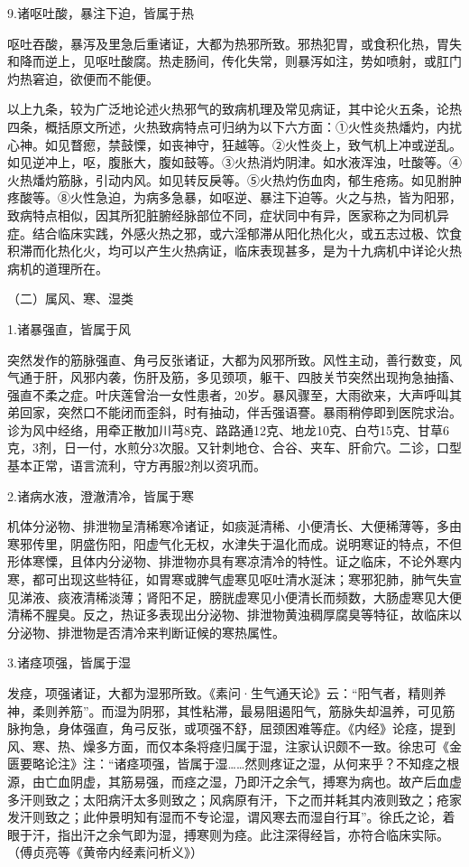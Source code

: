 \documentclass[draft,12pt]{ctexbook}
\begin{document}
9.诸呕吐酸，暴注下迫，皆属于热

呕吐吞酸，暴泻及里急后重诸证，大都为热邪所致。邪热犯胃，或食积化热，胃失和降而逆上，见呕吐酸腐。热走肠间，传化失常，则暴泻如注，势如喷射，或肛门灼热窘迫，欲便而不能便。

以上九条，较为广泛地论述火热邪气的致病机理及常见病证，其中论火五条，论热四条，概括原文所述，火热致病特点可归纳为以下六方面：①火性炎热燔灼，内扰心神。如见瞀瘛，禁鼓慄，如丧神守，狂越等。②火性炎上，致气机上冲或逆乱。如见逆冲上，呕，腹胀大，腹如鼓等。③火热消灼阴津。如水液浑浊，吐酸等。④火热燔灼筋脉，引动内风。如见转反戾等。⑤火热灼伤血肉，郁生疮疡。如见胕肿疼酸等。⑧火性急迫，为病多急暴，如呕逆、暴注下迫等。火之与热，皆为阳邪，致病特点相似，因其所犯脏腑经脉部位不同，症状同中有异，医家称之为同机异症。结合临床实践，外感火热之邪，或六淫郁滞从阳化热化火，或五志过极、饮食积滞而化热化火，均可以产生火热病证，临床表现甚多，是为十九病机中详论火热病机的道理所在。

（二）属风、寒、湿类

1.诸暴强直，皆属于风

突然发作的筋脉强直、角弓反张诸证，大都为风邪所致。风性主动，善行数变，风气通于肝，风邪内袭，伤肝及筋，多见颈项，躯干、四肢关节突然出现拘急抽搐、强直不柔之症。叶庆莲曾治一女性患者，20岁。暴风骤至，大雨欲来，大声呼叫其弟回家，突然口不能闭而歪斜，时有抽动，伴舌强语謇。暴雨稍停即到医院求治。诊为风中经络，用牵正散加川芎8克、路路通12克、地龙10克、白芍15克、甘草6克，3剂，日一付，水煎分3次服。又针刺地仓、合谷、夹车、肝俞穴。二诊，口型基本正常，语言流利，守方再服2剂以资巩而。

2.诸病水液，澄澈清冷，皆属于寒

机体分泌物、排泄物呈清稀寒冷诸证，如痰涎清稀、小便清长、大便稀薄等，多由寒邪传里，阴盛伤阳，阳虚气化无权，水津失于温化而成。说明寒证的特点，不但形体寒慄，且体内分泌物、排泄物亦具有寒凉清冷的特性。证之临床，不论外寒内寒，都可出现这些特征，如胃寒或脾气虚寒见呕吐清水涎沫；寒邪犯肺，肺气失宣见涕液、痰液清稀淡薄；肾阳不足，膀胱虚寒见小便清长而频数，大肠虚寒见大便清稀不腥臭。反之，热证多表现出分泌物、排泄物黄浊稠厚腐臭等特征，故临床以分泌物、排泄物是否清冷来判断证候的寒热属性。

3.诸痉项强，皆属于湿

发痉，项强诸证，大都为湿邪所致。《素问·生气通天论》云：“阳气者，精则养神，柔则养筋”。而湿为阴邪，其性粘滞，最易阻遏阳气，筋脉失却温养，可见筋脉拘急，身体强直，角弓反张，或项强不舒，屈颈困难等症。《内经》论痉，提到风、寒、热、燥多方面，而仅本条将痉归属于湿，注家认识颇不一致。徐忠可《金匮要略论注》注：“诸痉项强，皆属于湿……然则疼证之湿，从何来乎？不知痉之根源，由亡血阴虚，其筋易强，而痉之湿，乃即汗之余气，搏寒为病也。故产后血虚多汗则致之；太阳病汗太多则致之；风病原有汗，下之而并耗其内液则致之；疮家发汗则致之；此仲景明知有湿而不专论湿，谓风寒去而湿自行耳”。徐氏之论，着眼于汗，指出汗之余气即为湿，搏寒则为痉。此注深得经旨，亦符合临床实际。（傅贞亮等《黄帝内经素问析义》）
\end{document}
